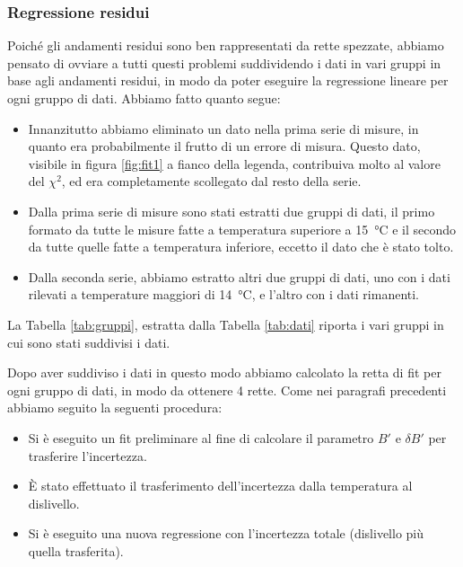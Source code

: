 \subsubsection{Regressione residui}

Poiché gli andamenti residui sono ben rappresentati da rette spezzate, abbiamo pensato di ovviare a tutti questi problemi suddividendo i
dati in vari gruppi in base agli andamenti residui, in modo da poter eseguire la regressione lineare per ogni gruppo di dati.
Abbiamo fatto quanto segue:

\label{sottoserie}
\begin{itemize}
    \item{Innanzitutto abbiamo eliminato un dato nella prima serie di misure, in quanto era probabilmente il frutto di un
        errore di misura. Questo dato, visibile in figura \ref{fig:fit1} a fianco della legenda,
        contribuiva molto al valore del $\chi^2$, ed era completamente scollegato dal resto della serie.}
    \item{Dalla prima serie di misure sono stati estratti due gruppi di dati, il primo formato da tutte le misure fatte
        a temperatura superiore a \SI{15}{\celsius} e il secondo da tutte quelle fatte a temperatura inferiore, eccetto
        il dato che è stato tolto.}
    \item{Dalla seconda serie, abbiamo estratto altri due gruppi di dati, uno con i dati rilevati a temperature maggiori di
        \SI{14}{\celsius}, e l'altro con i dati rimanenti.}
\end{itemize}

La Tabella \ref{tab:gruppi}, estratta dalla Tabella \ref{tab:dati} riporta i vari gruppi in cui sono stati suddivisi i dati.

Dopo aver suddiviso i dati in questo modo abbiamo calcolato la retta di fit per ogni gruppo di dati, in modo da ottenere
4 rette. Come nei paragrafi precedenti abbiamo seguito la seguenti procedura:

\begin{itemize}
    \item{Si è eseguito un fit preliminare al fine di calcolare il parametro $B'$ e $\delta B'$ per trasferire l'incertezza.}
    \item{È stato effettuato il trasferimento dell'incertezza dalla temperatura al dislivello.}
    \item{Si è eseguito una nuova regressione con l'incertezza totale (dislivello più quella trasferita).}
\end{itemize}

